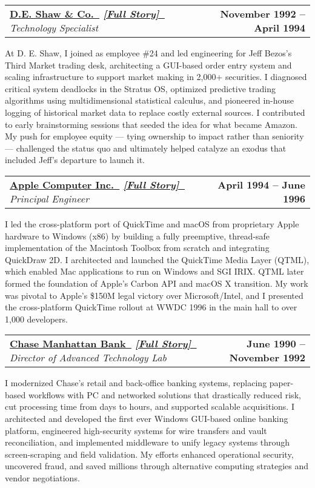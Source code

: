 \documentclass[letterpaper,11pt]{article}
\makeatletter
\newcommand{\resumeItem}[1]{
  \item\small{
    {#1 \vspace{-2pt}}
  }
}
\newcommand{\resumeSubheading}[4]{
  \vspace{-2pt}\item
    \begin{tabular*}{1.0\textwidth}[t]{l@{\extracolsep{\fill}}r}
      \textbf{#1}  \textit{\small#3} & \textbf{\small #2} \\
    \end{tabular*}\vspace{-7pt}
}
\makeatother
\begin{document}
\resumeSubheading
    {\href{https://www.deshaw.com}{D.E. Shaw \& Co.~\faExternalLink}
    \quad\small
    \textit
        {\href {https://paul-charlton.vercel.app/story/25}{[Full Story]~{\fontspec{Symbola}\symbol{"1F517}}}}
    }
    {November 1992 -- April 1994}
    {Technology Specialist}
    {New York, NY}
\resumeItem{
    At D. E. Shaw, I joined as employee \#24 and led engineering for Jeff Bezos’s Third Market trading desk, architecting a GUI-based order entry system and scaling infrastructure to support market making in 2,000+ securities. I diagnosed critical system deadlocks in the Stratus OS, optimized predictive trading algorithms using multidimensional statistical calculus, and pioneered in-house logging of historical market data to replace costly external sources. I contributed to early brainstorming sessions that seeded the idea for what became Amazon. My push for employee equity — tying ownership to impact rather than seniority — challenged the status quo and ultimately helped catalyze an exodus that included Jeff’s departure to launch it.
}

\resumeSubheading
    {\href{https://www.apple.com}{Apple Computer Inc.~\faExternalLink}
    \quad\small
    \textit
        {\href{https://paul-charlton.vercel.app/story/11}{[Full Story]~{\fontspec{Symbola}\symbol{"1F517}}}}
    }
    {April 1994 -- June 1996}
    {Principal Engineer}
    {Cupertino, CA}
\resumeItem{
    I led the cross-platform port of QuickTime and macOS from proprietary Apple hardware to Windows (x86) by building a fully preemptive, thread-safe implementation of the Macintosh Toolbox from scratch and integrating QuickDraw 2D. I architected and launched the QuickTime Media Layer (QTML), which enabled Mac applications to run on Windows and SGI IRIX. QTML later formed the foundation of Apple’s Carbon API and macOS X transition. My work was pivotal to Apple’s \$150M legal victory over Microsoft/Intel, and I presented the cross-platform QuickTime rollout at WWDC 1996 in the main hall to over 1,000 developers.
}

\resumeSubheading
    {\href{https://www.chase.com}{Chase Manhattan Bank~\faExternalLink}
    \quad\small
    \textit{
        \href{https://paul-charlton.vercel.app/story/17}{[Full Story]~{\fontspec{Symbola}\symbol{"1F517}}}}
    }
    {June 1990 -- November 1992}
    {Director of Advanced Technology Lab}
    {New York, NY}
\resumeItem{
    I modernized Chase’s retail and back-office banking systems, replacing paper-based workflows with PC and networked solutions that drastically reduced risk, cut processing time from days to hours, and supported scalable acquisitions. I architected and developed the first ever Windows GUI-based online banking platform, engineered high-security systems for wire transfers and vault reconciliation, and implemented middleware to unify legacy systems through screen-scraping and field validation. My efforts enhanced operational security, uncovered fraud, and saved millions through alternative computing strategies and vendor negotiations.
}
\end{document}
